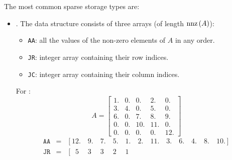 \highspace
The most common sparse storage types are:
\begin{itemize}
	\item {}. The data structure consists of three arrays (of length $\mathrm{nnz}\left(A\right)$):
	\begin{itemize}
		\item \texttt{AA}: all the values of the non-zero elements of $A$ in any order.
		
		\item \texttt{JR}: integer array containing their row indices.
		
		\item \texttt{JC}: integer array containing their column indices.
	\end{itemize}
	For :
	\begin{equation*}
		A = \begin{bmatrix}
			1. & 0. & 0.& 2. & 0. \\
			3. & 4. & 0.& 5. & 0. \\
			6. & 0. & 7.& 8. & 9. \\
			0. & 0. & 10.& 11. & 0. \\
			0. & 0. & 0.& 0. & 12. 
		\end{bmatrix}
	\end{equation*}
	\begin{equation*}
		\begin{array}{rcl}
			\texttt{AA} &=& \left[
				12.\hspace{1em}
				9.\hspace{1em}
				7.\hspace{1em}
				5.\hspace{1em}
				1.\hspace{1em}
				2.\hspace{1em}
				11.\hspace{1em}
				3.\hspace{1em}
				6.\hspace{1em}
				4.\hspace{1em}
				8.\hspace{1em}
				10.
			\right] \\ [.5em]
			\texttt{JR} &=& \left[
				\phantom{1}5\phantom{.}\hspace{1em}
				3\phantom{.}\hspace{1em}
				3\phantom{.}\hspace{1em}
				2\phantom{.}\hspace{1em}
				1\phantom{.}\hspace{1em}

\end{array}
\end{equation*}
\end{itemize}
